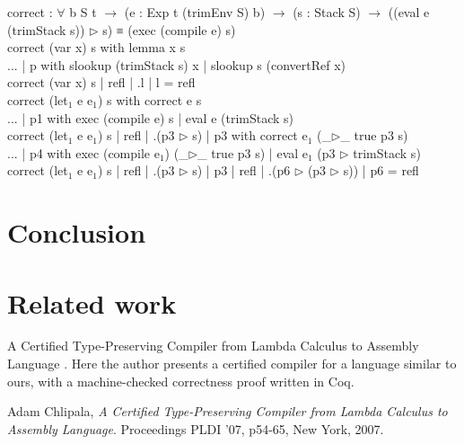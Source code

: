 \documentclass[paper=a4, fontsize=11pt]{scrartcl} %
\numberwithin{equation}{section} %
\numberwithin{figure}{section} %
\numberwithin{table}{section} %
\begin{document}
correct : $\forall$ {b S t} $\rightarrow$ (e : Exp t (trimEnv S) b) $\rightarrow$ (s : Stack S) $\rightarrow$ ((eval e (trimStack s)) $\rhd$ s) ≡ (exec (compile e) s)\\
correct (var x) s with lemma x s\\
... | p with slookup (trimStack s) x | slookup s (convertRef x) \\
correct (var x) s | refl | .l | l = refl\\
correct (let$_1$ e e$_1$) s with correct e s\\
... | p1 with exec (compile e) s | eval e (trimStack s)\\
correct (let$_1$ e e$_1$) s | refl | .(p3 $\rhd$ s) | p3 with correct e$_1$ (\_$\rhd$\_ {true} p3 s)\\
... | p4 with exec (compile e$_1$) (\_$\rhd$\_ {true} p3 s) | eval e$_1$ (p3 $\rhd$ trimStack s)\\
correct (let$_1$ e e$_1$) s | refl | .(p3 $\rhd$ s) | p3 | refl | .(p6 $\rhd$ (p3 $\rhd$ s)) | p6 = refl\\
\normalfont
\section{Conclusion}
\section{Related work} %
A Certified Type-Preserving Compiler from Lambda Calculus to
Assembly Language \cite{Chlipala}. Here the author presents a certified compiler for a language similar to ours, with a machine-checked correctness proof written in Coq.

\begin{thebibliography}{9}
	Adam Chlipala,
  	\emph{A Certified Type-Preserving Compiler from Lambda Calculus to
Assembly Language}.
  	Proceedings PLDI '07, p54-65, New York, 2007.
	
\end{thebibliography}
\end{document}
